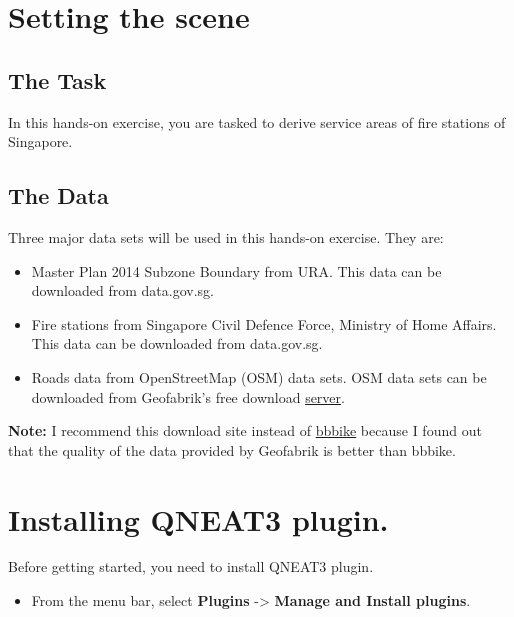 \documentclass[
  letterpaper,
  DIV=11,
  numbers=noendperiod]{scrreprt}
\providecommand{\tightlist}{%
  \setlength{\itemsep}{0pt}\setlength{\parskip}{0pt}}\usepackage{longtable,booktabs,array}
\begin{document}
\hypertarget{setting-the-scene-3}{%
\section{Setting the scene}\label{setting-the-scene-3}}

\hypertarget{the-task-4}{%
\subsection{The Task}\label{the-task-4}}

In this hands-on exercise, you are tasked to derive service areas of
fire stations of Singapore.

\hypertarget{the-data-4}{%
\subsection{The Data}\label{the-data-4}}

Three major data sets will be used in this hands-on exercise. They are:

\begin{itemize}
\tightlist
\item
  Master Plan 2014 Subzone Boundary from URA. This data can be
  downloaded from data.gov.sg.
\item
  Fire stations from Singapore Civil Defence Force, Ministry of Home
  Affairs. This data can be downloaded from data.gov.sg.
\item
  Roads data from OpenStreetMap (OSM) data sets. OSM data sets can be
  downloaded from Geofabrik's free download
  \href{https://download.geofabrik.de/}{server}.
\end{itemize}

\textbf{Note:} I recommend this download site instead of
\href{https://www.bbbike.org/}{bbbike} because I found out that the
quality of the data provided by Geofabrik is better than bbbike.

\hypertarget{installing-qneat3-plugin.-1}{%
\section{Installing QNEAT3 plugin.}\label{installing-qneat3-plugin.-1}}

Before getting started, you need to install QNEAT3 plugin.

\begin{itemize}
\tightlist
\item
  From the menu bar, select \textbf{Plugins} -\textgreater{}
  \textbf{Manage and Install plugins}.
\end{itemize}
\end{document}
